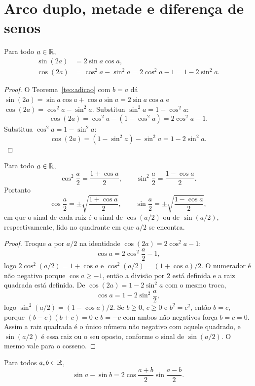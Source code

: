 \documentclass[11pt,a4paper]{article}
\begin{document}
\section{Arco duplo, metade e diferença de senos}

\begin{teorema}\label{teo:duplo}
Para todo $a\in\mathbb{R}$,
\begin{align*}
\sin(2a)&=2\sin a\cos a,\\
\cos(2a)&=\cos^2 a-\sin^2 a
=2\cos^2 a-1
=1-2\sin^2 a.
\end{align*}
\end{teorema}

\begin{proof}
O Teorema~\ref{teo:adicao} com $b=a$ dá $\sin(2a)=\sin a\cos a+\cos a\sin a=2\sin a\cos a$ e $\cos(2a)=\cos^2 a-\sin^2 a$. Substitua $\sin^2 a=1-\cos^2 a$:
\[
\cos(2a)=\cos^2 a-(1-\cos^2 a)=2\cos^2 a-1.
\]
Substitua $\cos^2 a=1-\sin^2 a$:
\[
\cos(2a)=(1-\sin^2 a)-\sin^2 a=1-2\sin^2 a.
\]
\end{proof}

\begin{teorema}\label{teo:metade}
Para todo $a\in\mathbb{R}$,
\[
\cos^2\frac{a}{2}=\frac{1+\cos a}{2},\qquad
\sin^2\frac{a}{2}=\frac{1-\cos a}{2}.
\]
Portanto
\[
\cos\frac{a}{2}=\pm\sqrt{\frac{1+\cos a}{2}},\qquad
\sin\frac{a}{2}=\pm\sqrt{\frac{1-\cos a}{2}},
\]
em que o sinal de cada raiz é o sinal de $\cos(a/2)$ ou de $\sin(a/2)$, respectivamente, lido no quadrante em que $a/2$ se encontra.
\end{teorema}

\begin{proof}
Troque $a$ por $a/2$ na identidade $\cos(2a)=2\cos^2 a-1$:
\[
\cos a=2\cos^2\frac{a}{2}-1,
\]
logo $2\cos^2(a/2)=1+\cos a$ e $\cos^2(a/2)=(1+\cos a)/2$. O numerador é não negativo porque $\cos a\ge -1$, então a divisão por $2$ está definida e a raiz quadrada está definida. De $\cos(2a)=1-2\sin^2 a$ com o mesmo troca,
\[
\cos a=1-2\sin^2\frac{a}{2},
\]
logo $\sin^2(a/2)=(1-\cos a)/2$. Se $b\ge 0$, $c\ge 0$ e $b^2=c^2$, então $b=c$, porque $(b-c)(b+c)=0$ e $b=-c$ com ambos não negativos força $b=c=0$. Assim a raiz quadrada é o único número não negativo com aquele quadrado, e $\sin(a/2)$ é essa raiz ou o seu oposto, conforme o sinal de $\sin(a/2)$. O mesmo vale para o cosseno.
\end{proof}

\begin{teorema}\label{teo:dif-senos}
Para todos $a,b\in\mathbb{R}$,
\[
\sin a-\sin b=2\cos\frac{a+b}{2}\sin\frac{a-b}{2}.
\]
\end{teorema}
\end{document}
